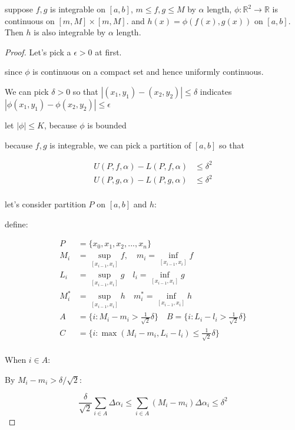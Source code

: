 \begin{thm}
    suppose $f,g$ is integrable on $[a,b]$, $m \le f,g \le M$ by $\alpha$ length, $\phi: \mathbb{R}^2 \to \mathbb{R}$ is continuous on $[m,M] \times [m,M]$.
    and $h(x) = \phi(f(x), g(x))$ on $[a,b]$. Then $h$ is also integrable by $\alpha$ length.
\end{thm}

\begin{proof}
    Let's pick a $\epsilon > 0$ at first.

   since $\phi$ is continuous on a compact set and hence uniformly continuous. 

   We can pick $\delta > 0$ so that $|(x_1,y_1)-(x_2,y_2)| \le \delta$ indicates $|\phi(x_1,y_1) - \phi(x_2,y_2)| \le \epsilon $

   let $\left| \phi \right| \le K$, because $\phi$ is bounded

   because $f,g$ is integrable, we can pick a partition of $[a,b]$ so that

   \begin{align*}
    U(P,f,\alpha) - L(P,f,\alpha) &\le \delta^2 \\
    U(P,g,\alpha) - L(P,g,\alpha) &\le \delta^2 \\
   \end{align*}

    let's consider partition $P$ on $[a,b]$ and $h$:

    define:

    \begin{align*}
        P &= \{ x_0, x_1,x_2,...,x_n \} \\
        M_i &= \sup_{[x_{i-1}, x_i]} f,\quad m_i = \inf_{[x_{i-1}, x_i]} f \\
        L_i &= \sup_{[x_{i-1}, x_i]} g \quad l_i = \inf_{[x_{i-1}, x_i]} g \\
        M^*_i &= \sup_{[x_{i-1}, x_i]} h \quad m^*_i = \inf_{[x_{i-1}, x_i]} h \\
        A &= \{ i: M_i - m_i > \frac{1}{\sqrt{2}}\delta \} \quad B = \{ i: L_i - l_i > \frac{1}{\sqrt{2}}\delta \} \\
        C &= \{ i: \max(M_i - m_i,L_i -l_i) \le \frac{1}{\sqrt{2}}\delta \} \\
    \end{align*}

    When $i \in A$:

    By $M_i - m_i > \delta/\sqrt{2}$:

    \[
\frac{\delta}{\sqrt{2}} \sum_{i \in A} \Delta \alpha_i       \le \sum_{i \in A}\left( M_i - m_i \right) \Delta \alpha_i \le \delta^2
    \]


\end{proof}
